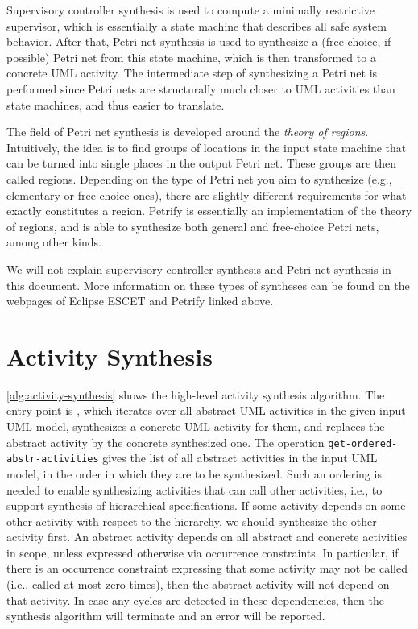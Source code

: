 \documentclass{article}
\newcommand{\keyw}[1]{\texttt{#1}}
\newcommand{\getOrderedAbstrActivitiesLabel}[0]{\keyw{get-ordered-abstr-activities}}
\theoremstyle{definition}
\begin{document}
Supervisory controller synthesis is used to compute a minimally restrictive supervisor, which is essentially a state machine that describes all safe system behavior.
After that, Petri net synthesis is used to synthesize a (free-choice, if possible) Petri net from this state machine, which is then transformed to a concrete UML activity.
The intermediate step of synthesizing a Petri net is performed since Petri nets are structurally much closer to UML activities than state machines, and thus easier to translate.

The field of Petri net synthesis is developed around the \emph{theory of regions}.
Intuitively, the idea is to find groups of locations in the input state machine that can be turned into single places in the output Petri net.
These groups are then called regions.
Depending on the type of Petri net you aim to synthesize (e.g., elementary or free-choice ones), there are slightly different requirements for what exactly constitutes a region.
Petrify is essentially an implementation of the theory of regions, and is able to synthesize both general and free-choice Petri nets, among other kinds.

We will not explain supervisory controller synthesis and Petri net synthesis in this document.
More information on these types of syntheses can be found on the webpages of Eclipse ESCET and Petrify linked above.

\section{Activity Synthesis}
\label{sec:algorithm}

\autoref{alg:activity-synthesis} shows the high-level activity synthesis algorithm.
The entry point is \synthAll, which iterates over all abstract UML activities in the given input UML model, synthesizes a concrete UML activity for them, and replaces the abstract activity by the concrete synthesized one.
The operation \getOrderedAbstrActivitiesLabel{} gives the list of all abstract activities in the input UML model, in the order in which they are to be synthesized.
Such an ordering is needed to enable synthesizing activities that can call other activities, i.e., to support synthesis of hierarchical specifications.
If some activity depends on some other activity with respect to the hierarchy, we should synthesize the other activity first.
An abstract activity depends on all abstract and concrete activities in scope, unless expressed otherwise via occurrence constraints.
In particular, if there is an occurrence constraint expressing that some activity may not be called (i.e., called at most zero times), then the abstract activity will not depend on that activity.
In case any cycles are detected in these dependencies, then the synthesis algorithm will terminate and an error will be reported.
\end{document}
